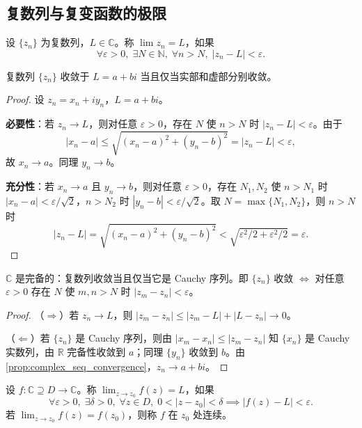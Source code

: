\subsection{复数列与复变函数的极限}

\begin{definition}[复数列极限]\label{def:complex_seq_limit}
设 $\{z_n\}$ 为复数列，$L \in \mathbb{C}$。称 $\lim z_n = L$，如果
\[
\forall \varepsilon > 0,\; \exists N \in \mathbb{N},\; \forall n > N,\; |z_n - L| < \varepsilon.
\]
\end{definition}

\begin{proposition}[复数列收敛的充要条件]\label{prop:complex_seq_convergence}
复数列 $\{z_n\}$ 收敛于 $L = a+bi$ 当且仅当实部和虚部分别收敛。
\end{proposition}

\begin{proof}
设 $z_n = x_n + iy_n$，$L = a + bi$。

\textbf{必要性}：若 $z_n \to L$，则对任意 $\varepsilon > 0$，存在 $N$ 使 $n > N$ 时 $|z_n - L| < \varepsilon$。由于
\[
|x_n - a| \le \sqrt{(x_n-a)^2 + (y_n-b)^2} = |z_n - L| < \varepsilon,
\]
故 $x_n \to a$。同理 $y_n \to b$。

\textbf{充分性}：若 $x_n \to a$ 且 $y_n \to b$，则对任意 $\varepsilon > 0$，存在 $N_1, N_2$ 使 $n > N_1$ 时 $|x_n - a| < \varepsilon/\sqrt{2}$，$n > N_2$ 时 $|y_n - b| < \varepsilon/\sqrt{2}$。取 $N = \max\{N_1, N_2\}$，则 $n > N$ 时
\[
|z_n - L| = \sqrt{(x_n-a)^2 + (y_n-b)^2} < \sqrt{\varepsilon^2/2 + \varepsilon^2/2} = \varepsilon.
\]
\end{proof}

\begin{property}\label{prop:complex_cauchy}
$\mathbb{C}$ 是完备的：复数列收敛当且仅当它是 Cauchy 序列。即 $\{z_n\}$ 收敛 $\iff$ 对任意 $\varepsilon > 0$ 存在 $N$ 使 $m, n > N$ 时 $|z_m - z_n| < \varepsilon$。
\end{property}

\begin{proof}
（$\Rightarrow$）若 $z_n \to L$，则 $|z_m - z_n| \le |z_m - L| + |L - z_n| \to 0$。

（$\Leftarrow$）若 $\{z_n\}$ 是 Cauchy 序列，则由 $|x_m - x_n| \le |z_m - z_n|$ 知 $\{x_n\}$ 是 Cauchy 实数列，由 $\mathbb{R}$ 完备性收敛到 $a$；同理 $\{y_n\}$ 收敛到 $b$。由 \cref{prop:complex_seq_convergence}，$z_n \to a+bi$。
\end{proof}

\begin{definition}[复变函数的极限与连续性]\label{def:complex_limit}
设 $f: \mathbb{C} \supseteq D \to \mathbb{C}$。称 $\lim_{z\to z_0} f(z) = L$，如果
\[
\forall \varepsilon > 0,\; \exists \delta > 0,\; \forall z \in D,\; 0 < |z - z_0| < \delta \implies |f(z) - L| < \varepsilon.
\]
若 $\lim_{z\to z_0} f(z) = f(z_0)$，则称 $f$ 在 $z_0$ 处连续。
\end{definition}

